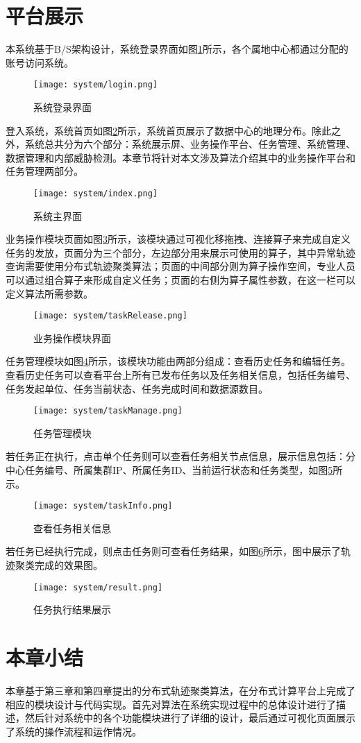 \section{平台展示}

本系统基于B/S架构设计，系统登录界面如图\ref{login}所示，各个属地中心都通过分配的账号访问系统。
\begin{figure}[H]
	\texttt{[image: system/login.png]}
	\caption{系统登录界面}
	\label{login}
\end{figure}


登入系统，系统首页如图\ref{index}所示，系统首页展示了数据中心的地理分布。除此之外，系统总共分为六个部分：系统展示屏、业务操作平台、任务管理、系统管理、数据管理和内部威胁检测。本章节将针对本文涉及算法介绍其中的业务操作平台和任务管理两部分。
\begin{figure}[H]
	\texttt{[image: system/index.png]}
	\caption{系统主界面}
	\label{index}
\end{figure}

业务操作模块页面如图\ref{taskRelease3}所示，该模块通过可视化移拖拽、连接算子来完成自定义任务的发放，页面分为三个部分，左边部分用来展示可使用的算子，其中异常轨迹查询需要使用分布式轨迹聚类算法；页面的中间部分则为算子操作空间，专业人员可以通过组合算子来形成自定义任务；页面的右侧为算子属性参数，在这一栏可以定义算法所需参数。
\begin{figure}[H]
	\texttt{[image: system/taskRelease.png]}
	\caption{业务操作模块界面}
	\label{taskRelease3}
\end{figure}

任务管理模块如图\ref{taskManage}所示，该模块功能由两部分组成：查看历史任务和编辑任务。查看历史任务可以查看平台上所有已发布任务以及任务相关信息，包括任务编号、任务发起单位、任务当前状态、任务完成时间和数据源数目。
\begin{figure}[H]
	\texttt{[image: system/taskManage.png]}
	\caption{任务管理模块}
	\label{taskManage}
\end{figure}

若任务正在执行，点击单个任务则可以查看任务相关节点信息，展示信息包括：分中心任务编号、所属集群IP、所属任务ID、当前运行状态和任务类型，如图\ref{taskInfo}所示。
\begin{figure}[H]
	\texttt{[image: system/taskInfo.png]}
	\caption{查看任务相关信息}
	\label{taskInfo}
\end{figure}

若任务已经执行完成，则点击任务则可查看任务结果，如图\ref{result}所示，图中展示了轨迹聚类完成的效果图。
\begin{figure}[H]
	\texttt{[image: system/result.png]}
	\caption{任务执行结果展示}
	\label{result}
\end{figure}

\section{本章小结}
本章基于第三章和第四章提出的分布式轨迹聚类算法，在分布式计算平台上完成了相应的模块设计与代码实现。首先对算法在系统实现过程中的总体设计进行了描述，然后针对系统中的各个功能模块进行了详细的设计，最后通过可视化页面展示了系统的操作流程和运作情况。
